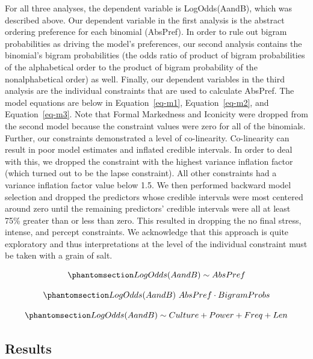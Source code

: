 \documentclass[
  12pt,
  letterpaper,
]{scrreprt}
\begin{document}
For all three analyses, the dependent variable is LogOdds(AandB), which
was described above. Our dependent variable in the first analysis is the
abstract ordering preference for each binomial (AbsPref). In order to
rule out bigram probabilities as driving the model's preferences, our
second analysis contains the binomial's bigram probabilities (the odds
ratio of product of bigram probabilities of the alphabetical order to
the product of bigram probability of the nonalphabetical order) as well.
Finally, our dependent variables in the third analysis are the
individual constraints that are used to calculate AbsPref. The model
equations are below in Equation~\ref{eq-m1}, Equation~\ref{eq-m2}, and
Equation~\ref{eq-m3}. Note that Formal Markedness and Iconicity were
dropped from the second model because the constraint values were zero
for all of the binomials. Further, our constraints demonstrated a level
of co-linearity. Co-linearity can result in poor model estimates and
inflated credible intervals. In order to deal with this, we dropped the
constraint with the highest variance inflation factor (which turned out
to be the lapse constraint). All other constraints had a variance
inflation factor value below 1.5. We then performed backward model
selection and dropped the predictors whose credible intervals were most
centered around zero until the remaining predictors' credible intervals
were all at least 75\% greater than or less than zero. This resulted in
dropping the no final stress, intense, and percept constraints. We
acknowledge that this approach is quite exploratory and thus
interpretations at the level of the individual constraint must be taken
with a grain of salt.

\begin{equation}\phantomsection\label{eq-m1}{
LogOdds(AandB) \sim AbsPref
}\end{equation}

\begin{equation}\phantomsection\label{eq-m2}{
LogOdds(AandB) ~ AbsPref \cdot BigramProbs
}\end{equation}

\begin{equation}\phantomsection\label{eq-m3}{
LogOdds(AandB) \sim Culture + Power + Freq + Len
}\end{equation}

\subsection{Results}\label{results-6}
\end{document}
